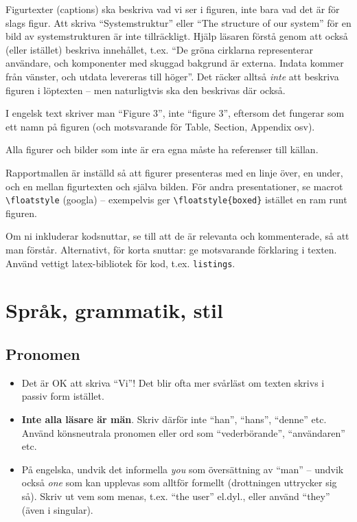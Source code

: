 Figurtexter (captions) ska beskriva vad vi ser i figuren, inte bara vad det är för slags figur. Att skriva ``Systemstruktur'' eller ``The structure of our system'' för en bild av systemstrukturen är inte tillräckligt. Hjälp läsaren förstå genom att också (eller istället) beskriva innehållet, t.ex. ``De gröna cirklarna representerar användare, och komponenter med skuggad bakgrund är externa. Indata kommer från vänster, och utdata levereras till höger''. Det räcker alltså \emph{inte} att beskriva figuren i löptexten -- men naturligtvis ska den beskrivas där också.

\label{figurers-namn}
I engelsk text skriver man ``Figure 3'', inte ``figure 3'', eftersom det fungerar som ett namn på figuren (och motsvarande för Table, Section, Appendix osv).

Alla figurer och bilder som inte är era egna måste ha referenser till källan.

Rapportmallen är inställd så att figurer presenteras med en linje över, en under, och en mellan figurtexten och själva bilden. För andra presentationer, se macrot \verb|\floatstyle| (googla) -- exempelvis ger \verb|\floatstyle{boxed}| istället en ram runt figuren.

Om ni inkluderar kodsnuttar, se till att de är relevanta och kommenterade, så att man förstår.  Alternativt, för korta snuttar: ge motsvarande förklaring i texten.
Använd vettigt latex-bibliotek för kod, t.ex. \texttt{listings}.

\section{Språk, grammatik, stil}
\label{sec:sprak-och-grammatik}

\subsection*{Pronomen}
\begin{itemize}
\item    Det är OK att skriva ``Vi''!
Det blir ofta mer svårläst om texten skrivs i passiv form istället.

\item    \textbf{Inte alla läsare är män}.
Skriv därför inte ``han'', ``hans'', ``denne'' etc.  Använd könsneutrala pronomen eller ord som ``vederbörande'', ``användaren'' etc. 

\item På engelska, undvik det informella \emph{you} som översättning av ``man'' -- undvik också \emph{one} som kan upplevas som alltför formellt (drottningen uttrycker sig så). Skriv ut vem som menas, t.ex. ``the user'' el.dyl., eller använd ``they'' (även i singular).
\end{itemize}

